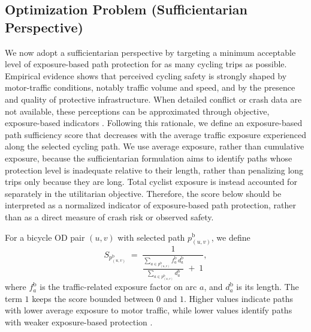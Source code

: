 \documentclass[lettersize,journal]{IEEEtran}
\begin{document}

\subsection{Optimization Problem (Sufficientarian Perspective)}
\label{section_safety_metric}

We now adopt a sufficientarian perspective by targeting a minimum acceptable level of exposure-based path protection for as many cycling trips as possible. Empirical evidence shows that perceived cycling safety is strongly shaped by motor-traffic conditions, notably traffic volume and speed, and by the presence and quality of protective infrastructure. When detailed conflict or crash data are not available, these perceptions can be approximated through objective, exposure-based indicators \cite{amiour2022objective,fuest2023bet,useche2019healthy}. Following this rationale, we define an exposure-based path sufficiency score that decreases with the average traffic exposure experienced along the selected cycling path. We use average exposure, rather than cumulative exposure, because the sufficientarian formulation aims to identify paths whose protection level is inadequate relative to their length, rather than penalizing long trips only because they are long. Total cyclist exposure is instead accounted for separately in the utilitarian objective. Therefore, the score below should be interpreted as a normalized indicator of exposure-based path protection, rather than as a direct measure of crash risk or observed safety.

For a bicycle OD pair $(u,v)$ with selected path $p_{(u,v)}^\mathrm{b}$, we define
\begin{equation}
\label{eq:path_safety_score}
S_{p_{(u,v)}^\mathrm{b}}
\;=\;
\frac{1}{
\displaystyle
\frac{\sum_{a \in p_{(u,v)}^\mathrm{b}} f_a^\mathrm{b}\, d_a^\mathrm{b}}
{\sum_{a \in p_{(u,v)}^\mathrm{b}} d_a^\mathrm{b}}
\;+\;1},
\end{equation}
where $f_a^\mathrm{b}$ is the traffic-related exposure factor on arc $a$, and $d_a^\mathrm{b}$ is its length. The term $1$ keeps the score bounded between $0$ and $1$. Higher values indicate paths with lower average exposure to motor traffic, while lower values identify paths with weaker exposure-based protection \cite{amiour2022objective,fuest2023bet,useche2019healthy}.
\end{document}
